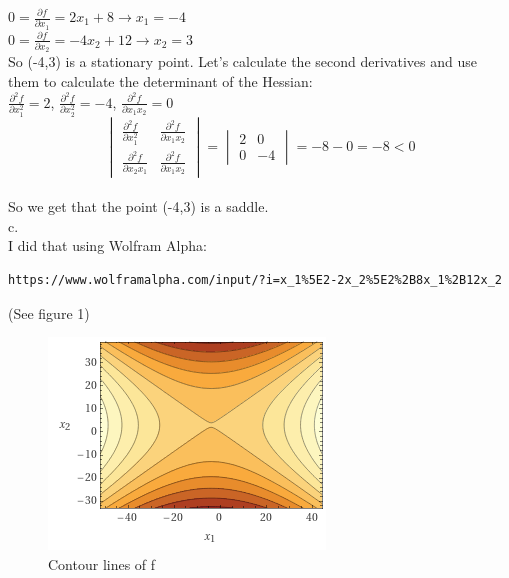 \documentclass[fleqn]{article}
\begin{document}
$ 0=\frac{\partial f}{\partial x_1} = 2x_1+8 \rightarrow x_1=-4$ \\

$ 0=\frac{\partial f}{\partial x_2} = -4x_2+12 \rightarrow x_2=3$ \\

So (-4,3) is a stationary point. Let's calculate the second derivatives and use them to calculate the determinant of the Hessian: \\

$ \frac{\partial^2 f}{\partial x_1^2} = 2$, 
$ \frac{\partial^2 f}{\partial x_2^2} = -4$,
$ \frac{\partial^2 f}{\partial x_1 x_2} =0$ \\

\[
\begin{vmatrix}
\frac{\partial^2 f}{\partial x_1^2} & \frac{\partial^2 f}{\partial x_1 x_2} \\
\frac{\partial^2 f}{\partial x_2 x_1} & \frac{\partial^2 f}{\partial x_1 x_2} \end{vmatrix} 
=
\begin{vmatrix} 2 & 0 \\ 0 & -4 \end{vmatrix}
= -8 - 0 = -8 <0
\]\\

So we get that the point (-4,3) is a saddle. \\

c. \\

I did that using Wolfram Alpha:
\begin{verbatim}
https://www.wolframalpha.com/input/?i=x_1%5E2-2x_2%5E2%2B8x_1%2B12x_2
\end{verbatim}
(See figure 1) \\

\begin{figure}[h!]
\includegraphics[width=0.8\linewidth]{part2_1c.PNG}
\caption{Contour lines of f}
\end{figure}
\end{document}
